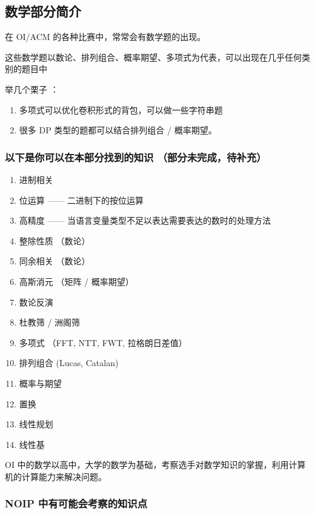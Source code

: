 
\subsection{数学部分简介}

在 OI/ACM 的各种比赛中，常常会有数学题的出现。

这些数学题以数论、排列组合、概率期望、多项式为代表，可以出现在几乎任何类别的题目中

举几个栗子 ：

\begin{enumerate}
\item 多项式可以优化卷积形式的背包，可以做一些字符串题
\item 很多 DP 类型的题都可以结合排列组合 / 概率期望。
\end{enumerate}

\hr

\subsubsection{以下是你可以在本部分找到的知识 （部分未完成，待补充）}

\begin{enumerate}
\item 进制相关
\item 位运算 —— 二进制下的按位运算
\item 高精度 —— 当语言变量类型不足以表达需要表达的数时的处理方法
\item 整除性质 （数论）
\item 同余相关 （数论）
\item 高斯消元 （矩阵 / 概率期望）
\item 数论反演
\item 杜教筛 / 洲阁筛
\item 多项式 （FFT, NTT, FWT, 拉格朗日差值）
\item 排列组合 (Lucas, Catalan)
\item 概率与期望
\item 置换
\item 线性规划
\item 线性基
\end{enumerate}

\hr

OI 中的数学以高中，大学的数学为基础，考察选手对数学知识的掌握，利用计算机的计算能力来解决问题。

\subsubsection{NOIP 中有可能会考察的知识点}

